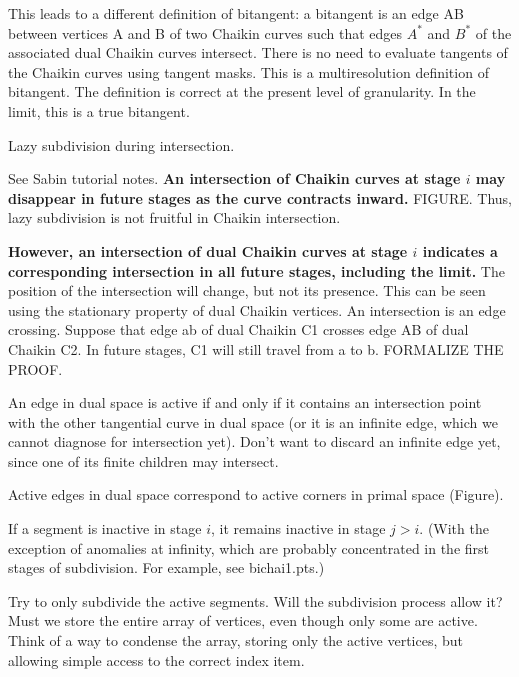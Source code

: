 \documentclass[12pt]{article}
\begin{document}
This leads to a different definition of bitangent:
a bitangent is an edge AB between vertices A and B of two Chaikin curves
such that edges $A^*$ and $B^*$ of the associated dual Chaikin curves intersect.
There is no need to evaluate tangents of the Chaikin curves using tangent masks.
This is a multiresolution definition of bitangent.
The definition is correct at the present level of granularity.
In the limit, this is a true bitangent.

\begin{defn2}
Lazy subdivision during intersection.
\end{defn2}

See Sabin tutorial notes.
{\bf An intersection of Chaikin curves at stage $i$ 
may disappear in future stages as the curve contracts inward.}
FIGURE.
Thus, lazy subdivision is not fruitful in Chaikin intersection.

{\bf However, an intersection of dual Chaikin curves at stage $i$ indicates
a corresponding intersection in all future stages, including the limit.}
The position of the intersection will change, but not its presence.
This can be seen using the stationary property of dual Chaikin vertices.
An intersection is an edge crossing.
Suppose that edge ab of dual Chaikin C1 crosses edge AB of dual Chaikin C2.
In future stages, C1 will still travel from a to b.
FORMALIZE THE PROOF.

\begin{defn2}
An edge in dual space is active if and only if it contains an intersection point
with the other tangential curve in dual space
(or it is an infinite edge, which we cannot diagnose for intersection yet).
Don't want to discard an infinite edge yet, since 
one of its finite children may intersect.
\end{defn2}

Active edges in dual space correspond to active corners in primal space
(Figure).

\begin{theorem}
If a segment is inactive in stage $i$, it remains inactive in stage $j>i$.
(With the exception of anomalies at infinity, which are probably concentrated
in the first stages of subdivision.  For example, see bichai1.pts.)
\end{theorem}

Try to only subdivide the active segments.
Will the subdivision process allow it?
Must we store the entire array of vertices, even though only some are active.
Think of a way to condense the array, storing only the active vertices,
but allowing simple access to the correct index item.
\end{document}
